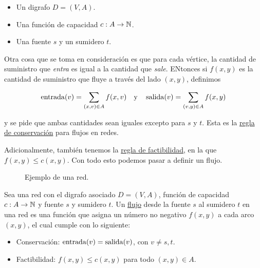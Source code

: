 \begin{itemize}
    \item Un digrafo $D=(V,A)$.
    \item Una función de capacidad $c: A \rightarrow \mathbb{N}$.
    \item Una fuente $s$ y un sumidero $t$.
\end{itemize}

Otra cosa que se toma en consideración es que para cada vértice, la cantidad de suministro que \textit{entra} es igual a la cantidad que \textit{sale}. ENtonces si $f(x,y)$ es la cantidad de suministro que fluye a través del lado $(x,y)$, definimos

\[
\operatorname{entrada}(v) = \sum_{(x,v) \in A} f(x,v) \quad \text{y} \quad \operatorname{salida}(v) = \sum_{(v,y) \in A} f(x,y)
\]

\noindent y se pide que ambas cantidades sean iguales excepto para $s$ y $t$. Esta es la \ul{regla de conservación} para flujos en redes.

Adicionalmente, también tenemos la \ul{regla de factibilidad}, en la que $f(x,y) \leq c(x,y)$. Con todo esto podemos pasar a definir un flujo.

\begin{figure}
    \centering
    \caption{Ejemplo de una red.}
    \label{fig:red}
\end{figure}

\begin{defn}
    Sea una red con el digrafo asociado $D=(V,A)$, función de capacidad $c: A \rightarrow \mathbb{N}$ y fuente $s$ y sumidero $t$. Un \ul{flujo} desde la fuente $s$ al sumidero $t$ en una red es una función que asigna un número no negativo $f(x,y)$ a cada arco $(x,y)$, el cual cumple con lo siguiente:
    
    \begin{itemize}
        \item Conservación: $\operatorname{entrada}(v) = \operatorname{salida}(v)$, con $v \neq s,t$.
        \item Factibilidad: $f(x,y) \leq c(x,y)$ para todo $(x,y) \in A$.
    \end{itemize}
\end{defn}

